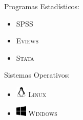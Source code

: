 \documentclass[a4paper,10pt]{article}
\begin{document}
\begin{minipage}[b]{\textwidth}
\begin{minipage}[b]{0.5 \textwidth}
\begin{itemize}
\end{itemize} \end{minipage} \hfill
 \begin{minipage}[b]{0.5 \textwidth}
 Programas Estadísticos:
\begin{itemize}
\item \textsc {SPSS}
\item \textsc {Eviews}
\item \textsc {Stata}
\end{itemize}
Sistemas Operativos:
\begin{itemize}
\item \includegraphics[height=0.5cm, width=0.5cm]{img/linux.png}  \textsc {Linux}
\item \includegraphics[height=0.5cm, width=0.5cm]{img/windows.png}  \textsc {Windows}
\end{itemize}
\end{minipage}\end{minipage}
\end{document}

